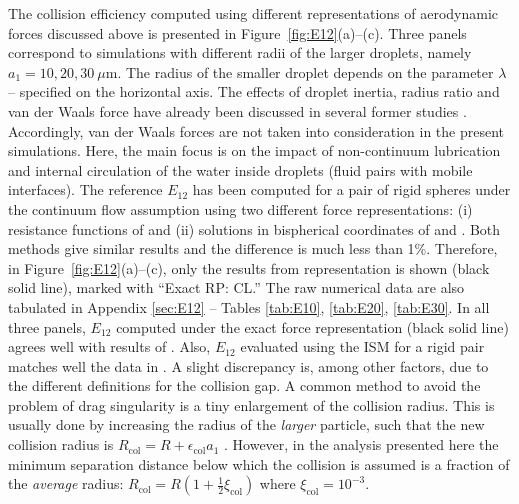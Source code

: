 \documentclass[../thesis.tex]{subfiles}
\begin{document}
The collision efficiency computed using different representations of aerodynamic forces discussed above is presented in Figure~\ref{fig:E12}(a)--(c). Three panels correspond to simulations with different radii of the larger droplets, namely $a_1=10, 20, 30~\mu$m. The radius of the smaller droplet depends on the parameter $\lambda$ -- specified on the horizontal axis. The effects of droplet inertia, radius ratio and van der Waals force have already been discussed in several former studies \citep{HJ70,D84,RWMG11}. Accordingly, van der Waals forces are not taken into consideration in the present simulations. Here, the main focus is on the impact of non-continuum lubrication and internal circulation of the water inside droplets (fluid pairs with mobile interfaces). The reference $E_{12}$ has been computed for a pair of rigid spheres under the continuum flow assumption using two different force representations: (i) resistance functions of \cite{JO84} and (ii) solutions in bispherical coordinates of \cite{SJ26} and \cite{ONM70}. Both methods give similar results and the difference is much less than 1\%. Therefore, in Figure~\ref{fig:E12}(a)--(c), only the results from \cite{JO84} representation is shown (black solid line), marked with ``Exact RP: CL.'' The raw numerical data are also tabulated in Appendix \ref{sec:E12} -- Tables \ref{tab:E10}, \ref{tab:E20}, \ref{tab:E30}. In all three panels, $E_{12}$ computed under the exact force representation (black solid line) agrees well with results of \cite[][Figure 3]{HJ70}. Also, $E_{12}$ evaluated using the ISM for a rigid pair matches well the data in \cite[][Figure~8 and Table~5]{WAG05}. A slight discrepancy is, among other factors, due to the different definitions for the collision gap. A common method to avoid the problem of drag singularity is a tiny enlargement of the collision radius. 
This is usually done by increasing the radius of the \textit{larger} particle, such that the new collision radius is $R_\text{col}=R+\epsilon_\text{col}a_1$ \citep{HJ70,WAG05,RWMG11}. However, in the analysis presented here the minimum separation distance below which the collision is assumed is a fraction of the \textit{average} radius: $R_\text{col}=R(1+\tfrac{1}{2}\xi_\text{col})$ where $\xi_\text{col}=10^{-3}$.
\end{document}
